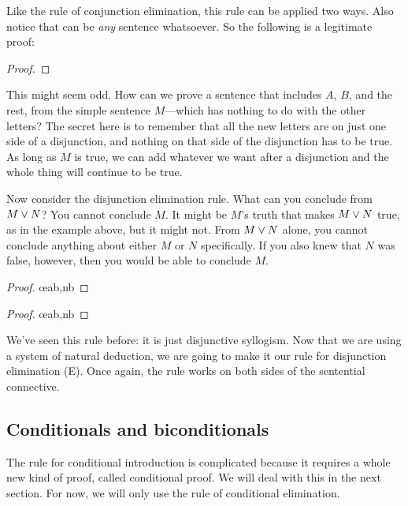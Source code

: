 Like the rule of conjunction elimination, this rule can be applied two ways. Also notice that  can be \emph{any} sentence whatsoever. So the following is a legitimate proof:

\begin{proof}
\end{proof}

This might seem odd. How can we prove a sentence that includes $A$, $B$, and the rest, from the simple sentence $M$---which has nothing to do with the other letters? The secret here is to remember that all the new letters are on just one side of a disjunction, and nothing on that side of the disjunction has to be true. As long as $M$ is true, we can add whatever we want after a disjunction and the whole thing will continue to be true. 

Now consider the disjunction elimination rule. What can you conclude from $M \vee N$? You cannot conclude $M$. It might be $M$'s truth that makes $M \vee N$ true, as in the example above, but it might not. From $M \vee N$ alone, you cannot conclude anything about either $M$ or $N$ specifically. If you also knew that $N$ was false, however, then you would be able to conclude $M$.

\begin{multicols}{2}
\begin{proof}
	 \oe{ab,nb}
\end{proof}

\begin{proof}
	 \oe{ab,nb}
\end{proof}
\end{multicols}

We've seen this rule before: it is just disjunctive syllogism. Now that we are using a system of natural deduction, we are going to make it our rule for disjunction elimination ({\eor}E). Once again, the rule works on both sides of the sentential connective. 

\subsection{Conditionals and biconditionals}

The rule for conditional introduction is complicated because it requires a whole new kind of proof, called conditional proof. We will deal with this in the next section. For now, we will only use the rule of conditional elimination.

